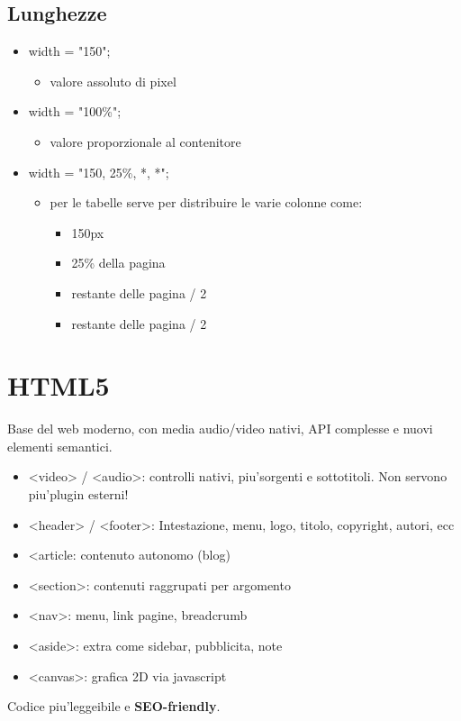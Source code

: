 \documentclass[a4paper,12pt]{article}
\begin{document}
\subsection{Lunghezze}
\begin{itemize}
    \item width = "150";
    \begin{itemize}
        \item valore assoluto di pixel
    \end{itemize}
    \item width = "100\%";
    \begin{itemize}
        \item valore proporzionale al contenitore
    \end{itemize}
    \item width = "150, 25\%, *, *";
    \begin{itemize}
        \item per le tabelle serve per distribuire le varie colonne come:
        \begin{itemize}
            \item 150px
            \item 25\% della pagina
            \item restante delle pagina / 2
            \item restante delle pagina / 2
        \end{itemize}
    \end{itemize}
\end{itemize}
\section{HTML5}
Base del web moderno, con media audio/video nativi, API complesse e nuovi elementi semantici.
\begin{itemize}
    \item <video> / <audio>: controlli nativi, piu'sorgenti e sottotitoli. Non servono piu'plugin esterni!
    \item <header> / <footer>: Intestazione, menu, logo, titolo, copyright, autori, ecc
    \item <article: contenuto autonomo (blog)
    \item <section>: contenuti raggrupati per argomento
    \item <nav>: menu, link pagine, breadcrumb
    \item <aside>: extra come sidebar, pubblicita, note
    \item <canvas>: grafica 2D via javascript
\end{itemize}
Codice piu'leggeibile e \textbf{SEO-friendly}.
\end{document}
